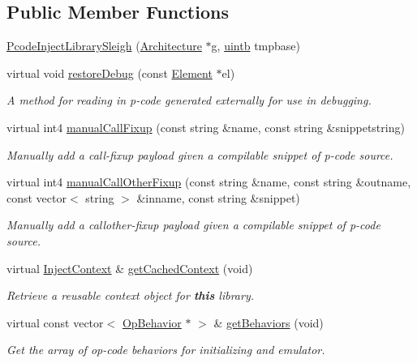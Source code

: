 \subsection*{Public Member Functions}
\begin{DoxyCompactItemize}
\item 
\mbox{\hyperlink{class_pcode_inject_library_sleigh_a25188bce489eae0287ce89d8588b961a}{Pcode\+Inject\+Library\+Sleigh}} (\mbox{\hyperlink{class_architecture}{Architecture}} $\ast$g, \mbox{\hyperlink{types_8h_a2db313c5d32a12b01d26ac9b3bca178f}{uintb}} tmpbase)
\item 
virtual void \mbox{\hyperlink{class_pcode_inject_library_sleigh_a121a82e796311b4d5b163cdf773e2235}{restore\+Debug}} (const \mbox{\hyperlink{class_element}{Element}} $\ast$el)
\begin{DoxyCompactList}\small\item\em A method for reading in p-\/code generated externally for use in debugging. \end{DoxyCompactList}\item 
virtual int4 \mbox{\hyperlink{class_pcode_inject_library_sleigh_a4cce009469fb3679881ea73bc2ed9284}{manual\+Call\+Fixup}} (const string \&name, const string \&snippetstring)
\begin{DoxyCompactList}\small\item\em Manually add a call-\/fixup payload given a compilable snippet of p-\/code {\itshape source}. \end{DoxyCompactList}\item 
virtual int4 \mbox{\hyperlink{class_pcode_inject_library_sleigh_a5effe6ebe2d5b20644c2066d427283ae}{manual\+Call\+Other\+Fixup}} (const string \&name, const string \&outname, const vector$<$ string $>$ \&inname, const string \&snippet)
\begin{DoxyCompactList}\small\item\em Manually add a callother-\/fixup payload given a compilable snippet of p-\/code {\itshape source}. \end{DoxyCompactList}\item 
virtual \mbox{\hyperlink{class_inject_context}{Inject\+Context}} \& \mbox{\hyperlink{class_pcode_inject_library_sleigh_a37471f5a78e16c84fc26cfaff1a7434b}{get\+Cached\+Context}} (void)
\begin{DoxyCompactList}\small\item\em Retrieve a reusable context object for {\bfseries{this}} library. \end{DoxyCompactList}\item 
virtual const vector$<$ \mbox{\hyperlink{class_op_behavior}{Op\+Behavior}} $\ast$ $>$ \& \mbox{\hyperlink{class_pcode_inject_library_sleigh_a878ef6bdf58bd19fa82318248836b3d8}{get\+Behaviors}} (void)
\begin{DoxyCompactList}\small\item\em Get the array of op-\/code behaviors for initializing and emulator. \end{DoxyCompactList}\end{DoxyCompactItemize}
